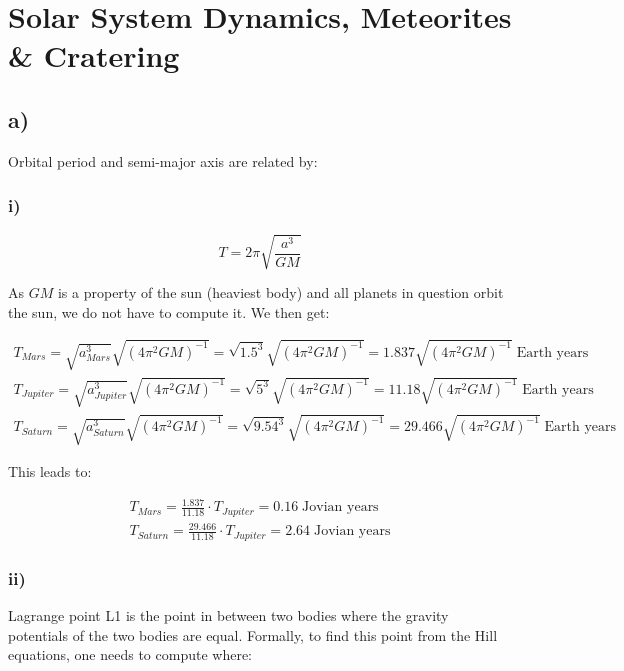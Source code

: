 \section{Solar System Dynamics, Meteorites \& Cratering }\label{sec:q1}    

\subsection*{a)}
Orbital period and semi-major axis are related by:

\subsubsection*{i)}
\begin{equation}
    T = 2 \pi \sqrt{\frac{a^3}{GM}}
\end{equation}

As $GM$ is a property of the sun (heaviest body) and all planets in question orbit the sun, we do not have to compute it. We then get:

\begin{equation}
    \begin{split}
        T_{Mars} = \sqrt{a_{Mars}^3} \sqrt{(4\pi^2 GM)^{-1}} = \sqrt{1.5^3} \sqrt{(4\pi^2 GM)^{-1}} = 1.837 \sqrt{(4\pi^2 GM)^{-1}} \; \text{Earth years}\\
        T_{Jupiter} = \sqrt{a_{Jupiter}^3} \sqrt{(4\pi^2 GM)^{-1}} = \sqrt{5^3} \sqrt{(4\pi^2 GM)^{-1}} = 11.18 \sqrt{(4\pi^2 GM)^{-1}} \; \text{Earth years}\\
        T_{Saturn} = \sqrt{a_{Saturn}^3} \sqrt{(4\pi^2 GM)^{-1}} = \sqrt{9.54^3} \sqrt{(4\pi^2 GM)^{-1}} = 29.466 \sqrt{(4\pi^2 GM)^{-1}} \; \text{Earth years}
    \end{split}
\end{equation}

This leads to:

\begin{equation}
    \begin{split}
        T_{Mars} = \frac{1.837}{11.18} \cdot T_{Jupiter} = 0.16 \; \text{Jovian years} \\
        T_{Saturn} = \frac{29.466}{11.18} \cdot T_{Jupiter} = 2.64 \; \text{Jovian years} 
    \end{split}
\end{equation}

\subsubsection*{ii)}
Lagrange point L1 is the point in between two bodies where the gravity potentials of the two bodies are equal. Formally, to find this point from the Hill equations, one needs to compute where:

